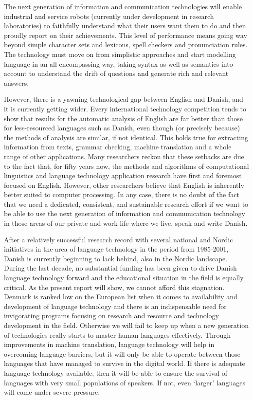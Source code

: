 \begin{multicols}{2}
The next generation of information and communication technologies will
enable industrial and service robots (currently under development in
research laboratories) to faithfully understand what their users want
them to do and then proudly report on their achievements.  This level
of performance means going way beyond simple character sets and
lexicons, spell checkers and pronunciation rules. The technology must
move on from simplistic approaches and start modelling language in an
all-encompassing way, taking syntax as well as semantics into account
to understand the drift of questions and generate rich and relevant
answers.

However, there is a yawning technological gap between English and
Danish, and it is currently getting wider. Every international
technology competition tends to show that results for the automatic
analysis of English are far better than those for less-resourced
languages such as Danish, even though (or precisely because) the
methods of analysis are similar, if not identical. This holds true for
extracting information from texts, grammar checking, machine
translation and a whole range of other applications. Many researchers
reckon that these setbacks are due to the fact that, for fifty years
now, the methods and algorithms of computational linguistics and
language technology application research have first and foremost
focused on English. However, other researchers believe that English is
inherently better suited to computer processing. In any case, there is
no doubt of the fact that we need a dedicated, consistent, and
sustainable research effort if we want to be able to use the next
generation of information and communication technology in those areas
of our private and work life where we live, speak and write Danish.

After a relatively successful research record with several national
and Nordic initiatives in the area of language technology in the
period from 1985-2001, Danish is currently beginning to lack behind,
also in the Nordic landscape. During the last decade, no substantial
funding has been given to drive Danish language technology forward and
the educational situation in the field is equally critical. As the
present report will show, we cannot afford this stagnation. Denmark is
ranked low on the European list when it comes to availability and
development of language technology and there is an indispensable need
for invigorating programs focusing on research and resource and
technology development in the field. Otherwise we will fail to keep up
when a new generation of technologies really starts to master human
languages effectively. Through improvements in machine translation,
language technology will help in overcoming language barriers, but it
will only be able to operate between those languages that have managed
to survive in the digital world. If there is adequate language
technology available, then it will be able to ensure the survival of
languages with very small populations of speakers. If not, even
`larger' languages will come under severe pressure.
\end{multicols}

